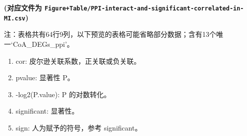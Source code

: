 \documentclass[
]{article}
\providecommand{\tightlist}{%
  \setlength{\itemsep}{0pt}\setlength{\parskip}{0pt}}
\begin{document}
\textbf{(对应文件为 \texttt{Figure+Table/PPI-interact-and-significant-correlated-in-MI.csv})}

\begin{center}\begin{tcolorbox}[colback=gray!10, colframe=gray!50, width=0.9\linewidth, arc=1mm, boxrule=0.5pt]注：表格共有64行9列，以下预览的表格可能省略部分数据；含有13个唯一`CoA\_DEGs\_ppi'。
\end{tcolorbox}
\end{center}
\begin{center}\begin{tcolorbox}[colback=gray!10, colframe=gray!50, width=0.9\linewidth, arc=1mm, boxrule=0.5pt]\begin{enumerate}\tightlist
\item cor:  皮尔逊关联系数，正关联或负关联。
\item pvalue:  显著性 P。
\item -log2(P.value):  P 的对数转化。
\item significant:  显著性。
\item sign:  人为赋予的符号，参考 significant。
\end{enumerate}\end{tcolorbox}
\end{center}
\end{document}
